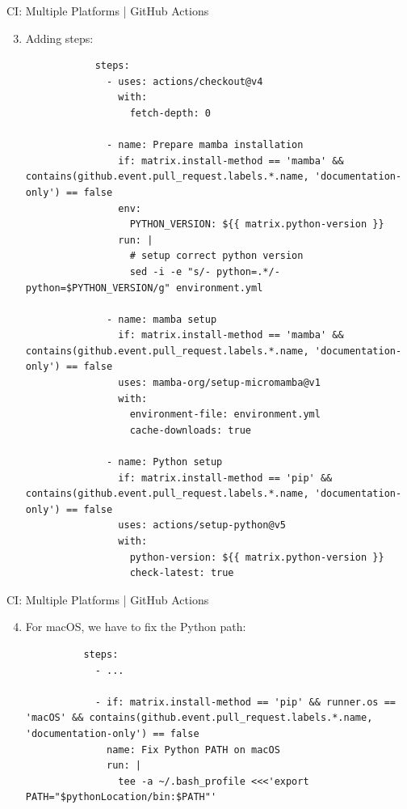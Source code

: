 \begin{darkframe}[fragile]{CI: Multiple Platforms | GitHub Actions}
  \begin{enumerate}
    \setcounter{enumi}{2}
    \item Adding steps:
        \scriptsize
        \begin{verbatim}
            steps:
              - uses: actions/checkout@v4
                with:
                  fetch-depth: 0

              - name: Prepare mamba installation
                if: matrix.install-method == 'mamba' &&  contains(github.event.pull_request.labels.*.name, 'documentation-only') == false
                env:
                  PYTHON_VERSION: ${{ matrix.python-version }}
                run: |
                  # setup correct python version
                  sed -i -e "s/- python=.*/- python=$PYTHON_VERSION/g" environment.yml

              - name: mamba setup
                if: matrix.install-method == 'mamba' && contains(github.event.pull_request.labels.*.name, 'documentation-only') == false
                uses: mamba-org/setup-micromamba@v1
                with:
                  environment-file: environment.yml
                  cache-downloads: true

              - name: Python setup
                if: matrix.install-method == 'pip' && contains(github.event.pull_request.labels.*.name, 'documentation-only') == false
                uses: actions/setup-python@v5
                with:
                  python-version: ${{ matrix.python-version }}
                  check-latest: true
        \end{verbatim}
  \end{enumerate}
\end{darkframe}

\begin{darkframe}[fragile]{CI: Multiple Platforms | GitHub Actions}
  \begin{enumerate}
    \setcounter{enumi}{3}
    \item For macOS, we have to fix the Python path:
        \scriptsize
        \begin{verbatim}
          steps:
            - ...

            - if: matrix.install-method == 'pip' && runner.os == 'macOS' && contains(github.event.pull_request.labels.*.name, 'documentation-only') == false
              name: Fix Python PATH on macOS
              run: |
                tee -a ~/.bash_profile <<<'export PATH="$pythonLocation/bin:$PATH"'
        \end{verbatim}
  \end{enumerate}
\end{darkframe}


